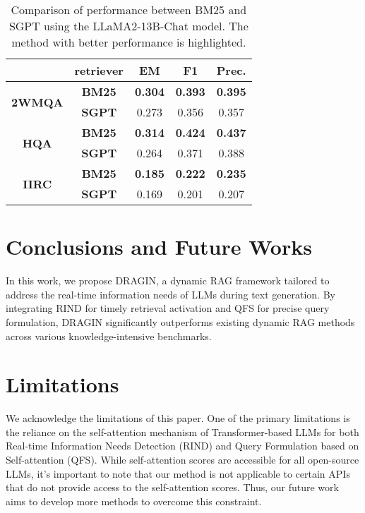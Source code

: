 \begin{table}[t]
\caption{Comparison of performance between BM25 and SGPT using the LLaMA2-13B-Chat model. The method with better performance is highlighted.}
\label{tab:retriever}
\centering
\small
\setlength\tabcolsep{5pt} %
\begin{tabular}{ccccc}
\toprule
                                          & \textbf{retriever} & \textbf{EM}     & \textbf{F1}     & \textbf{Prec.}  \\
                                          \midrule
\multirow{2}{*}{\textbf{2WMQA}} & \textbf{BM25}      & \textbf{0.304}  & \textbf{0.393} & \textbf{0.395} \\
                                          & \textbf{SGPT}      & 0.273           & 0.356          & 0.357          \\
                                          \midrule
\multirow{2}{*}{\textbf{HQA}}        & \textbf{BM25}      & \textbf{0.314}& \textbf{0.424}& \textbf{0.437} \\
                                          & \textbf{SGPT}      & 0.264           & 0.371          & 0.388          \\
                                          \midrule
\multirow{2}{*}{\textbf{IIRC}}            & \textbf{BM25}      & \textbf{0.185} & \textbf{0.222} & \textbf{0.235} \\
                                          & \textbf{SGPT}      & 0.169          & 0.201          & 0.207          \\
                                          \toprule
\end{tabular}
\end{table}

\section{Conclusions and Future Works}

In this work, we propose DRAGIN, a dynamic RAG framework tailored to address the real-time information needs of LLMs during text generation. By integrating RIND for timely retrieval activation and QFS for precise query formulation, DRAGIN significantly outperforms existing dynamic RAG methods across various knowledge-intensive benchmarks. 

\section{Limitations}
We acknowledge the limitations of this paper. One of the primary limitations is the reliance on the self-attention mechanism of Transformer-based LLMs for both Real-time Information Needs Detection (RIND) and Query Formulation based on Self-attention (QFS). While self-attention scores are accessible for all open-source LLMs, it's important to note that our method is not applicable to certain APIs that do not provide access to the self-attention scores. Thus, our future work aims to develop more methods to overcome this constraint.


